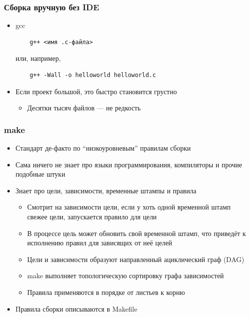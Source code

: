 \documentclass{../../slides-style}
\begin{document}
    \begin{frame}[fragile]
        \frametitle{Сборка вручную без IDE}
        \begin{itemize}
            \item gcc
            \begin{footnotesize}
                \begin{verbatim}
    g++ <имя .c-файла>
                \end{verbatim}
            \end{footnotesize}
            или, например,
            \begin{footnotesize}
                \begin{verbatim}
    g++ -Wall -o helloworld helloworld.c
                \end{verbatim}
            \end{footnotesize}
            \item Если проект большой, это быстро становится грустно
            \begin{itemize}
                \item Десятки тысяч файлов --- не редкость
            \end{itemize}
        \end{itemize}
    \end{frame}

    \begin{frame}
        \frametitle{make}
        \begin{itemize}
            \item Стандарт де-факто по \enquote{низкоуровневым} правилам сборки
            \item Сама ничего не знает про языки программирования, компиляторы и прочие подобные штуки
            \item Знает про цели, зависимости, временные штампы и правила
            \begin{itemize}
                \item Смотрит на зависимости цели, если у хоть одной временной штамп свежее цели, запускается правило для цели
                \item В процессе цель может обновить свой временной штамп, что приведёт к исполнению правил для зависящих от неё целей
                \item Цели и зависимости образуют направленный ациклический граф (DAG)
                \item make выполняет топологическую сортировку графа зависимостей
                \item Правила применяются в порядке от листьев к корню
            \end{itemize}
            \item Правила сборки описываются в Makefile
        \end{itemize}
    \end{frame}
\end{document}
